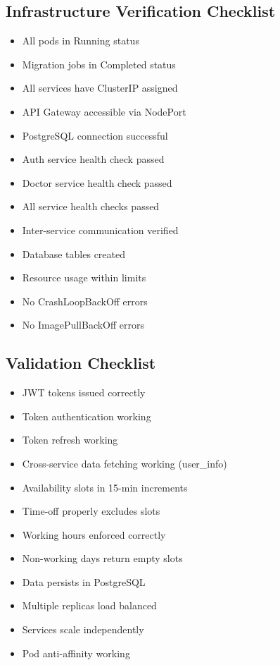 \documentclass[12pt,a4paper]{article}
\begin{document}
\subsection{Infrastructure Verification Checklist}
\begin{itemize}[label=$\square$]
    \item All pods in Running status
    \item Migration jobs in Completed status
    \item All services have ClusterIP assigned
    \item API Gateway accessible via NodePort
    \item PostgreSQL connection successful
    \item Auth service health check passed
    \item Doctor service health check passed
    \item All service health checks passed
    \item Inter-service communication verified
    \item Database tables created
    \item Resource usage within limits
    \item No CrashLoopBackOff errors
    \item No ImagePullBackOff errors
\end{itemize}

\subsection{Validation Checklist}
\begin{itemize}[label=$\square$]
    \item JWT tokens issued correctly
    \item Token authentication working
    \item Token refresh working
    \item Cross-service data fetching working (user\_info)
    \item Availability slots in 15-min increments
    \item Time-off properly excludes slots
    \item Working hours enforced correctly
    \item Non-working days return empty slots
    \item Data persists in PostgreSQL
    \item Multiple replicas load balanced
    \item Services scale independently
    \item Pod anti-affinity working
\end{itemize}
\end{document}
